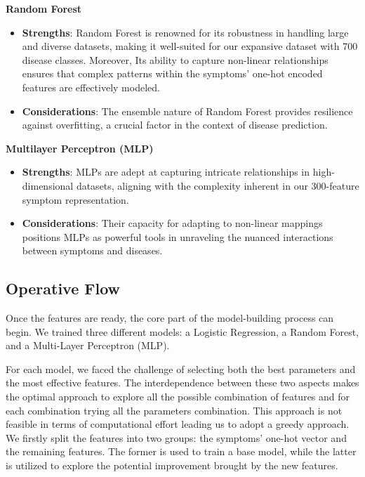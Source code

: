 \textbf{Random Forest}\\
\begin{itemize}
    \item \textbf{Strengths}: Random Forest is renowned for its robustness in handling large and diverse datasets, making 
    it well-suited for our expansive dataset with 700 disease classes. Moreover, Its ability to capture non-linear relationships 
    ensures that complex patterns within the symptoms' one-hot encoded features are effectively modeled.
    \item \textbf{Considerations}: The ensemble nature of Random Forest provides resilience against overfitting, a crucial factor 
    in the context of disease prediction.
\end{itemize}
\vspace{0.4cm}

\textbf{Multilayer Perceptron (MLP)}\\
\begin{itemize}
    \item \textbf{Strengths}: MLPs are adept at capturing intricate relationships in high-dimensional datasets, 
    aligning with the complexity inherent in our 300-feature symptom representation.
    \item \textbf{Considerations}: Their capacity for adapting to non-linear mappings positions MLPs as powerful 
    tools in unraveling the nuanced interactions between symptoms and diseases.
\end{itemize}




\subsection{Operative Flow}

Once the features are ready, the core part of the model-building process can begin. 
We trained three different models: a Logistic Regression, a Random Forest, and a Multi-Layer Perceptron (MLP).

For each model, we faced the challenge of selecting both the best parameters and the most effective features. 
The interdependence between these two aspects makes the optimal approach to explore all the possible combination of features
and for each combination trying all the parameters combination. This approach is not feasible in terms of computational effort
leading us to adopt a greedy approach. We firstly split the features into two 
groups: the symptoms' one-hot vector and the remaining features. The former is used to train a base model, 
while the latter is utilized to explore the potential improvement brought by the new features.

